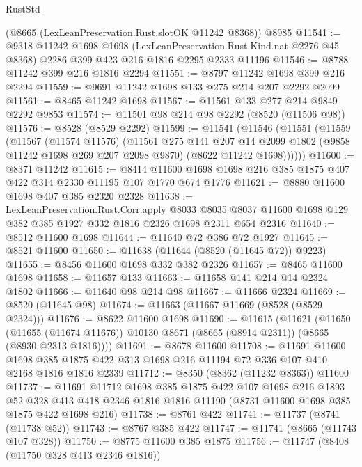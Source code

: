 \begin{lexlean}{RustStd}
\begin{coremodule}
    (@8665 (LexLeanPreservation.Rust.slotOK @11242 @8368))
    @8985
@11541 := @9318
    @11242
    @1698
    @1698
    (LexLeanPreservation.Rust.Kind.nat @2276 @45 @8368)
    @2286
    @399
    @423
    @216
    @1816
    @2295
    @2333
    @11196
@11546 := @8788 @11242 @399 @216 @1816 @2294
@11551 := @8797 @11242 @1698 @399 @216 @2294
@11559 := @9691 @11242 @1698 @133 @275 @214 @207 @2292 @2099
@11561 := @8465 @11242 @1698
@11567 := @11561 @133 @277 @214 @9849 @2292 @9853
@11574 := @11501 @98 @214 @98 @2292 (@8520 (@11506 @98))
@11576 := @8528 (@8529 @2292)
@11599 := @11541
    (@11546
      (@11551
        (@11559
          (@11567
            (@11574 @11576)
            (@11561
              @275
              @141
              @207
              @14
              @2099
              @1802
              (@9858 @11242 @1698 @269 @207 @2098 @9870)
              (@8622 @11242 @1698))))))
@11600 := @8371 @11242
@11615 := @8414 @11600 @1698 @1698 @216 @385 @1875 @407 @422 @314 @2330 @11195 @107 @1770 @674 @1776
@11621 := @8880 @11600 @1698 @407 @385 @2320 @2328
@11638 := LexLeanPreservation.Rust.Corr.apply
    @8033
    @8035
    @8037
    @11600
    @1698
    @129
    @382
    @385
    @1927
    @332
    @1816
    @2326
    @1698
    @2311
    @654
    @2316
@11640 := @8512 @11600 @1698
@11644 := @11640 @72 @386 @72 @1927
@11645 := @8521 @11600
@11650 := @11638 (@11644 (@8520 (@11645 @72)) @9223)
@11655 := @8456 @11600 @1698 @332 @382 @2326
@11657 := @8465 @11600 @1698
@11658 := @11657 @133
@11663 := @11658 @141 @214 @14 @2324 @1802
@11666 := @11640 @98 @214 @98
@11667 := @11666 @2324
@11669 := @8520 (@11645 @98)
@11674 := @11663 (@11667 @11669 (@8528 (@8529 @2324)))
@11676 := @8622 @11600 @1698
@11690 := @11615
    (@11621
      (@11650
        (@11655 (@11674 @11676))
        @10130
        @8671
        (@8665 (@8914 @2311))
        (@8665 (@8930 @2313 @1816))))
@11691 := @8678 @11600
@11708 := @11691
    @11600
    @1698
    @385
    @1875
    @422
    @313
    @1698
    @216
    @11194
    @72
    @336
    @107
    @410
    @2168
    @1816
    @1816
    @2339
@11712 := @8350 (@8362 (@11232 @8363)) @11600
@11737 := @11691
    @11712
    @1698
    @385
    @1875
    @422
    @107
    @1698
    @216
    @1893
    @52
    @328
    @413
    @418
    @2346
    @1816
    @1816
    @11190
    (@8731 @11600 @1698 @385 @1875 @422 @1698 @216)
@11738 := @8761 @422
@11741 := @11737 (@8741 (@11738 @52))
@11743 := @8767 @385 @422
@11747 := @11741 (@8665 (@11743 @107 @328))
@11750 := @8775 @11600 @385 @1875
@11756 := @11747 (@8408 (@11750 @328 @413 @2346 @1816))

\end{coremodule}
\end{lexlean}
